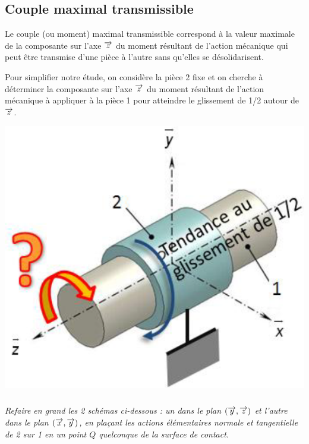 \documentclass[10pt,fleqn]{article} %
\begin{document}
\begin{multicols}{2}
\begin{multicols}{2}
\subsection*{Couple maximal transmissible}

Le couple (ou moment) maximal transmissible correspond à la valeur maximale 
de la composante sur l’axe $\overrightarrow{z}$ du moment résultant de l’action mécanique qui peut 
être transmise d’une pièce à l’autre sans qu’elles se désolidarisent. 
 
Pour simplifier notre étude, on considère la pièce 2 fixe et on cherche à 
déterminer la composante sur l’axe $\overrightarrow{z}$ du moment résultant de l’action mécanique 
à appliquer à la pièce 1 pour atteindre le glissement de 1/2 autour de $\overrightarrow{z}$.
 
\begin{center}
\includegraphics[width=.7\linewidth]{images/fig_04}
\end{center}

\subparagraph{}
\textit{Refaire en grand les 2 schémas ci-dessous : un dans le plan $(\overrightarrow{y}, \overrightarrow{z})$ et l’autre dans le plan $(\overrightarrow{x}, \overrightarrow{y})$, en plaçant les actions élémentaires normale et tangentielle de 2 sur 1 en un point $Q$ quelconque de la surface de contact. }
\ifprof
\begin{corrige}~\\


\end{corrige}
\end{multicols}
\end{multicols}
\end{document}
